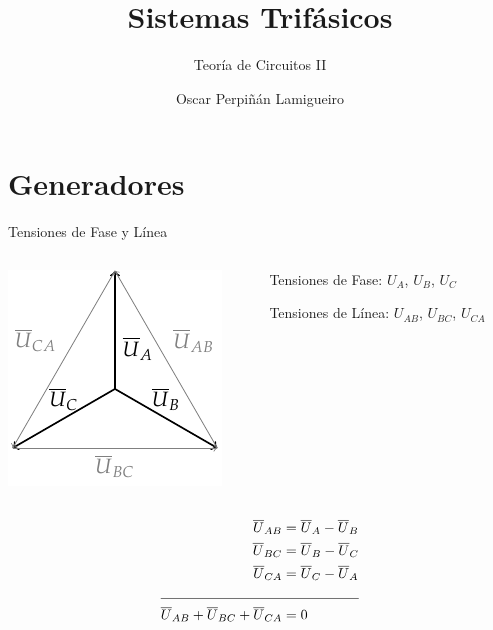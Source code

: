 \documentclass[aspectratio=169, usenames,svgnames,dvipsnames]{beamer}
\author{Oscar Perpiñán Lamigueiro}
\date{}
\title{Sistemas Trifásicos}
\subtitle{Teoría de Circuitos II}
\begin{document}
\maketitle

\section{Generadores}
\label{sec:org89b5ed6}
\begin{frame}[label={sec:orga546e03}]{Tensiones de Fase y Línea}
\begin{columns}
\begin{column}{0.4\columnwidth}
\begin{center}
\includegraphics[height=0.4\textheight]{../figs/FasoresTrifasica_ABC.pdf}
\end{center}
\end{column}

\begin{column}{0.6\columnwidth}
Tensiones de \alert{Fase}: \(U_A\), \(U_B\), \(U_C\)

Tensiones de \alert{Línea}: \(U_{AB}\), \(U_{BC}\), \(U_{CA}\)
\end{column}
\end{columns}

     \begin{align*}
       \overline{U}_{AB} &= \overline{U}_A - \overline{U}_B\\
       \overline{U}_{BC} &= \overline{U}_B - \overline{U}_C\\
       \overline{U}_{CA} &= \overline{U}_C - \overline{U}_A\\
\cline{1-2}
       \overline{U}_{AB} + \overline{U}_{BC} + \overline{U}_{CA} &= 0     \end{align*}
\end{frame}
\end{document}
